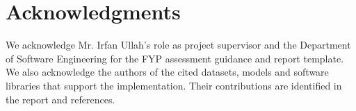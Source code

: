 \chapter*{Acknowledgments}
We acknowledge Mr. Irfan Ullah's role as project supervisor and the Department of Software Engineering for the FYP assessment guidance and report template. We also acknowledge the authors of the cited datasets, models and software libraries that support the implementation. Their contributions are identified in the report and references.
